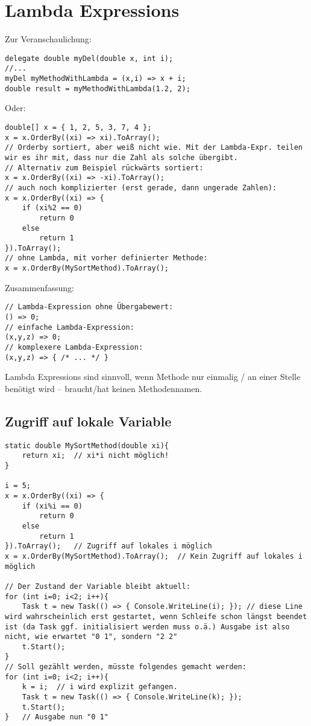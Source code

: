 \documentclass{scrreprt}
\begin{document}
\section{Lambda Expressions}
Zur Veranschaulichung:
\begin{lstlisting}[language={[Sharp]C}]
delegate double myDel(double x, int i);
//...
myDel myMethodWithLambda = (x,i) => x + i;
double result = myMethodWithLambda(1.2, 2);
\end{lstlisting}
Oder:
\begin{lstlisting}[language={[Sharp]C}]
double[] x = { 1, 2, 5, 3, 7, 4 };
x = x.OrderBy((xi) => xi).ToArray();
// Orderby sortiert, aber weiß nicht wie. Mit der Lambda-Expr. teilen wir es ihr mit, dass nur die Zahl als solche übergibt.
// Alternativ zum Beispiel rückwärts sortiert:
x = x.OrderBy((xi) => -xi).ToArray();
// auch noch komplizierter (erst gerade, dann ungerade Zahlen):
x = x.OrderBy((xi) => {
	if (xi%2 == 0)
		return 0
	else
		return 1
}).ToArray();
// ohne Lambda, mit vorher definierter Methode:
x = x.OrderBy(MySortMethod).ToArray();
\end{lstlisting}
Zusammenfassung:
\begin{lstlisting}[language={[Sharp]C}]
// Lambda-Expression ohne Übergabewert:
() => 0;
// einfache Lambda-Expression:
(x,y,z) => 0;
// komplexere Lambda-Expression:
(x,y,z) => { /* ... */ }
\end{lstlisting}
Lambda Expressions sind sinnvoll, wenn Methode nur einmalig / an einer Stelle benötigt wird -- braucht/hat keinen Methodennamen.
\subsection*{Zugriff auf lokale Variable}
\begin{lstlisting}[language={[Sharp]C}]
static double MySortMethod(double xi){
	return xi;	// xi*i nicht möglich!
}

i = 5;
x = x.OrderBy((xi) => {
	if (xi%i == 0)
		return 0
	else
		return 1
}).ToArray();	// Zugriff auf lokales i möglich
x = x.OrderBy(MySortMethod).ToArray();	// Kein Zugriff auf lokales i möglich

// Der Zustand der Variable bleibt aktuell:
for (int i=0; i<2; i++){
	Task t = new Task(() => { Console.WriteLine(i); }); // diese Line wird wahrscheinlich erst gestartet, wenn Schleife schon längst beendet ist (da Task ggf. initialisiert werden muss o.ä.) Ausgabe ist also nicht, wie erwartet "0 1", sondern "2 2"
	t.Start();
}
// Soll gezählt werden, müsste folgendes gemacht werden:
for (int i=0; i<2; i++){
	k = i;	// i wird explizit gefangen.
	Task t = new Task(() => { Console.WriteLine(k); }); 
	t.Start();
}	// Ausgabe nun "0 1"
\end{lstlisting}
\end{document}
